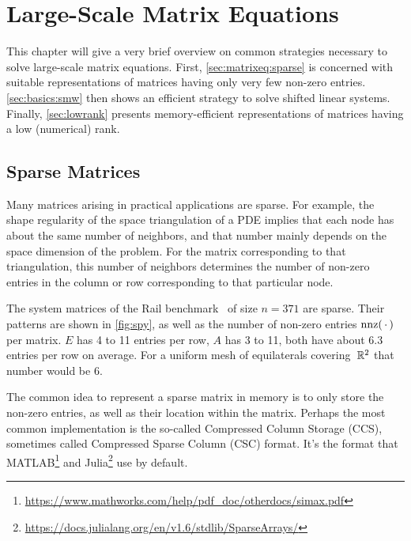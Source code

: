 \chapter{Large-Scale Matrix Equations}
\label{sec:matrixeq}

This chapter will give a very brief overview on common strategies necessary to solve large-scale matrix equations.
First, \autoref{sec:matrixeq:sparse} is concerned with suitable representations of matrices having only very few non-zero entries.
\autoref{sec:basics:smw} then shows an efficient strategy to solve shifted linear systems.
Finally, \autoref{sec:lowrank} presents memory-efficient representations of matrices having a low (numerical) rank.

\section{Sparse Matrices}
\label{sec:matrixeq:sparse}

Many matrices arising in practical applications are sparse.
For example, the shape regularity of the space triangulation of a \ac{PDE}
implies that each node has about the same number of neighbors,
and that number mainly depends on the space dimension of the problem.
For the matrix corresponding to that triangulation,
this number of neighbors determines the number of non-zero entries in the column or row corresponding to that particular node.

\begin{example}
  The system matrices of the Rail benchmark~\cite{morwiki_steel} of size $n=371$ are sparse.
  Their patterns are shown in \autoref{fig:spy}, as well as the number of non-zero entries $\nnz(\optional{})$ per matrix.
  $E$ has 4 to 11 entries per row, $A$ has 3 to 11, both have about \num{6.3} entries per row on average.
  For a uniform mesh of equilaterals covering~$\mathbb{R}^2$ that number would be \num{6}.
\end{example}

The common idea to represent a sparse matrix in memory is to only store the non-zero entries,
as well as their location within the matrix.
Perhaps the most common implementation is the so-called Compressed Column Storage (CCS),
sometimes called Compressed Sparse Column (CSC) format.
It's the format that \eg MATLAB\footnote{\url{https://www.mathworks.com/help/pdf_doc/otherdocs/simax.pdf}}
and Julia\footnote{\url{https://docs.julialang.org/en/v1.6/stdlib/SparseArrays/}} use by default.

